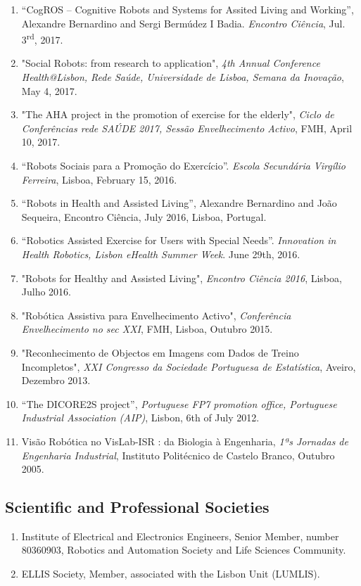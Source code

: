 \begin{enumerate}
  Parkinson'', \emph{Congresso CNS}, April 7, 2018, Torres Vedras,
  Portugal.
\item
  ``CogROS -- Cognitive Robots and Systems for Assited Living and
  Working'', Alexandre Bernardino and Sergi Bermúdez I Badia.
  \emph{Encontro Ciência}, Jul. 3\textsuperscript{rd}, 2017.
\item
  "Social Robots: from research to application", \emph{4th Annual
  Conference Health@Lisbon, Rede Saúde, Universidade de Lisboa, Semana
  da Inovação}, May 4, 2017.~
\item
  "The AHA project in the promotion of exercise for the elderly",
  \emph{Ciclo de Conferências rede SAÚDE 2017, Sessão Envelhecimento
  Activo}, FMH, April 10, 2017.
\item
  ``Robots Sociais para a Promoção do Exercício''. \emph{Escola
  Secundária Virgílio Ferreira}, Lisboa, February 15, 2016.~
\item
  ``Robots in Health and Assisted Living'', Alexandre Bernardino and
  João Sequeira, Encontro Ciência, July 2016, Lisboa, Portugal.
\item
  ``Robotics Assisted Exercise for Users with Special Needs''.
  \emph{Innovation in Health Robotics, Lisbon eHealth Summer Week}. June
  29th, 2016.
\item
  "Robots for Healthy and Assisted Living", \emph{Encontro Ciência
  2016}, Lisboa, Julho 2016.
\item
  "Robótica Assistiva para Envelhecimento Activo", \emph{Conferência
  Envelhecimento no sec XXI}, FMH, Lisboa, Outubro 2015.
\item
  "Reconhecimento de Objectos em Imagens com Dados de Treino
  Incompletos", \emph{XXI Congresso da Sociedade Portuguesa de
  Estatística}, Aveiro, Dezembro 2013.
\item
  ``The DICORE2S project'', \emph{Portuguese FP7 promotion office,
  Portuguese Industrial Association (AIP)}, Lisbon, 6th of July 2012.
\item
  Visão Robótica no VisLab-ISR : da Biologia à Engenharia, \emph{1ªs
  Jornadas de Engenharia Industrial}, Instituto Politécnico de Castelo
  Branco, Outubro 2005.
\end{enumerate}

\subsection{Scientific and Professional
Societies}\label{scientific-and-professional-societies}

\begin{enumerate}
\def\labelenumi{\arabic{enumi}.}
\item
  Institute of Electrical and Electronics Engineers, Senior Member,
  number 80360903, Robotics and Automation Society and Life Sciences
  Community.
\item
  ELLIS Society, Member, associated with the Lisbon Unit (LUMLIS).
\end{enumerate}
